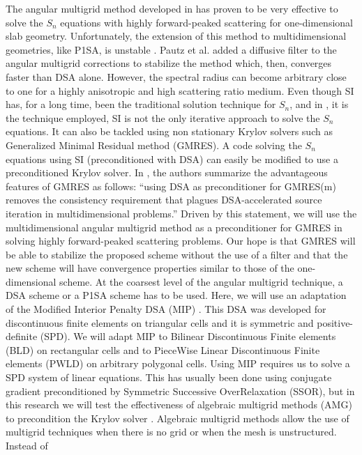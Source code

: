 The angular multigrid method developed in \cite{multigrid_1d} has proven to 
be very effective to solve the $S_n$ equations with highly forward-peaked 
scattering for one-dimensional slab geometry. Unfortunately, the extension 
of this method to multidimensional geometries, like P1SA, is unstable 
\cite{multigrid_2d}. Pautz et al. added a diffusive filter to the angular 
multigrid corrections to stabilize the method which, then, converges faster 
than DSA alone. However, 
the spectral radius can become arbitrary close to one for a highly anisotropic 
and high scattering ratio medium. Even though SI has, for a long time, been
the traditional solution technique for $S_n$, and in
\cite{multigrid_1d,multigrid_2d}, it is the technique employed, SI is not the
only iterative approach to solve the $S_n$ equations. It can also be tackled
using non stationary Krylov solvers such as Generalized Minimal Residual 
method (GMRES). A code solving the $S_n$ equations using SI (preconditioned 
with DSA) can easily be modified to use a preconditioned Krylov 
solver. In \cite{ttg}, the authors summarize the advantageous features of 
GMRES as follows: ``using DSA as preconditioner for GMRES(m) removes the 
consistency requirement that plagues DSA-accelerated source iteration in 
multidimensional problems.'' Driven by this statement, we will use the 
multidimensional angular multigrid method as a preconditioner for GMRES in 
solving highly forward-peaked scattering problems. Our hope is
that GMRES will be able to stabilize the proposed scheme without the use of a
filter and that the new scheme will have convergence properties similar to
those of the one-dimensional scheme. At the coarsest level of the angular
multigrid technique, a DSA scheme or a P1SA scheme has to be used. Here, we 
will use an adaptation of the Modified 
Interior Penalty DSA (MIP) \cite{mip}. This DSA was developed for discontinuous 
finite elements on triangular cells and it is symmetric and positive-definite
(SPD). We will adapt MIP to Bilinear Discontinuous Finite elements (BLD) on 
rectangular cells and to PieceWise Linear Discontinuous Finite elements (PWLD) 
\cite{pwld_3d,pwld_2d} on arbitrary polygonal cells. Using MIP requires us to 
solve a SPD system of linear equations. This has 
usually been done using conjugate gradient preconditioned by Symmetric
Successive OverRelaxation (SSOR), but in this research we will test the 
effectiveness of algebraic multigrid methods (AMG) to precondition the Krylov solver 
\cite{amg,amg_course}. Algebraic multigrid methods allow the use of multigrid
techniques when there is no grid or when the mesh is unstructured. Instead of
